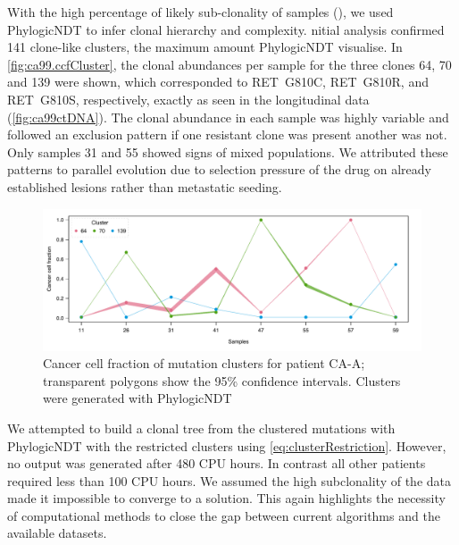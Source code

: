 With the high percentage of likely sub-clonality of samples (), we used PhylogicNDT to infer clonal hierarchy and complexity. nitial analysis confirmed 141 clone-like clusters,  the maximum amount PhylogicNDT  visualise. In \autoref{fig:ca99.ccfCluster}, the clonal abundances per sample for the three clones 64, 70 and 139 were shown, which corresponded to RET~G810C, RET~G810R, and RET~G810S, respectively, exactly as seen in the longitudinal data (\autoref{fig:ca99ctDNA}). The clonal abundance in each sample was highly variable and followed an exclusion pattern if one resistant clone was present another was not. Only samples 31 and 55 showed signs of mixed populations. We attributed these patterns to parallel evolution due to  selection pressure of the drug on already established lesions rather than metastatic seeding.

\begin{figure}[htp]
\centering
\includegraphics[width=.99\linewidth]{Figures/CASCADE/CA99/CA99.ccf_cluster.pdf}
\caption[Cancer cell fraction of mutation clusters of clonal tree for patient CA-A]{Cancer cell fraction of mutation clusters for patient CA-A; transparent polygons show the 95\% confidence intervals. Clusters were generated with PhylogicNDT} \label{fig:ca99.ccfCluster}
\end{figure}

We attempted to build a clonal tree from the clustered mutations with PhylogicNDT with the restricted clusters using \autoref{eq:clusterRestriction}. However, no output was generated after 480 CPU hours. In contrast all other patients required less than 100 CPU hours. We assumed the high subclonality of the data made it impossible to converge to a solution. This  again highlights the necessity of computational methods to close the gap between current algorithms and the available datasets.



